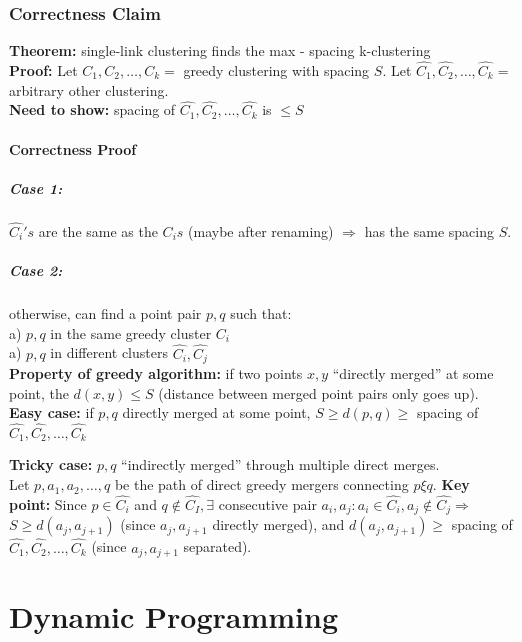 \documentclass{scrartcl}
\begin{document}
\subsubsection{Correctness Claim}
\label{sec:8-2}
{\bf Theorem: } single-link clustering finds the max - spacing k-clustering\\
{\bf Proof: } Let $C_1, C_2, \dots, C_k = $ greedy clustering with spacing $S$.
Let $\hat{C_1}, \hat{C_2}, \dots, \hat{C_k} = $ arbitrary other clustering.\\
{\bf Need to show: } spacing of $\hat{C_1}, \hat{C_2}, \dots, \hat{C_k}$ is
$\leq S$

\paragraph{Correctness Proof}

\subparagraph{Case 1:} $\hat{C_i}'s$ are the same as the $C_is$ (maybe after
renaming) $\Rightarrow$ has the same spacing $S$.

\subparagraph{Case 2:}
otherwise, can find a point pair $p, q$ such that:\\
a) $p, q$ in the same greedy cluster $C_i$\\
a) $p, q$ in different clusters $\hat{C_i}, \hat{C_j}$\\

{\bf Property of greedy algorithm: } if two points $x, y$ ``directly merged'' at
some point, the $d(x, y) \leq S$ (distance between merged point pairs only goes
up). \\

{\bf Easy case: } if $p,q$ directly merged at some point, $S \geq d(p,q) \geq$
spacing of $\hat{C_1}, \hat{C_2}, \dots, \hat{C_k}$

{\bf Tricky case: } $p,q$ ``indirectly merged'' through multiple direct
merges.\\
Let $p, a_1, a_2, \dots, q$ be the path of direct greedy mergers connecting $p
\xi q$. {\bf Key point: } Since $p \in \hat{C_i}$ and $q \notin \hat{C_I},
\exists$ consecutive pair $a_i, a_j: a_i \in \hat{C_i}, a_j \notin \hat{C_j}
\Rightarrow$ $S \geq d(a_j, a_{j+1})$ (since $a_j, a_{j+1}$ directly merged),
and $d(a_j, a_{j+1}) \geq $ spacing of $\hat{C_1}, \hat{C_2}, \dots, \hat{C_k}$
(since $a_j, a_{j+1}$ separated).

\section{Dynamic Programming}
\label{sec:8-1}
\end{document}
